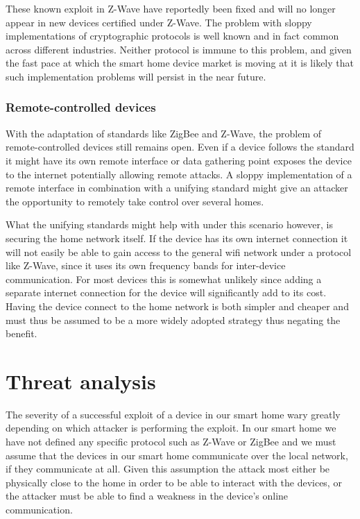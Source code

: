\documentclass[12pt]{article}
\begin{document}
These known exploit in Z-Wave have reportedly been fixed and will no longer appear in new devices certified under Z-Wave. The problem with sloppy implementations of cryptographic protocols is well known and in fact common across different industries. Neither protocol is immune to this problem, and given the fast pace at which the smart home device market is moving at it is likely that such implementation problems will persist in the near future.

\subsubsection{Remote-controlled devices}
\label{subs:Remote-controlled devices}

With the adaptation of standards like ZigBee and Z-Wave, the problem of remote-controlled devices still remains open. Even if a device follows the standard it might have its own remote interface or data gathering point exposes the device to the internet potentially allowing remote attacks. A sloppy implementation of a remote interface in combination with a unifying standard might give an attacker the opportunity to remotely take control over several homes.

What the unifying standards might help with under this scenario however, is securing the home network itself. If the device has its own internet connection it will not easily be able to gain access to the general wifi network under a protocol like Z-Wave, since it uses its own frequency bands for inter-device communication. For most devices this is somewhat unlikely since adding a separate internet connection for the device will significantly add to its cost. Having the device connect to the home network is both simpler and cheaper and  must thus be assumed to be a more widely adopted strategy thus negating the benefit.

\newpage

\section{Threat analysis}
\label{sec:Threat analysis}

The severity of a successful exploit of a device in our smart home wary greatly depending on which attacker is performing the exploit. In our smart home we have not defined any specific protocol such as Z-Wave or ZigBee and we must assume that the devices in our smart home communicate over the local network, if they communicate at all. Given this assumption the attack most either be physically close to the home in order to be able to interact with the devices, or the attacker must be able to find a weakness in the device's online communication. 
\end{document}

